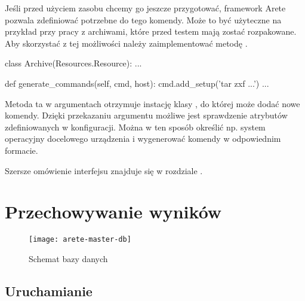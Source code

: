 \documentclass[00-praca-magisterska.tex]{subfiles}
\begin{document}
Jeśli przed użyciem zasobu chcemy go jeszcze przygotować, framework Arete
pozwala zdefiniować potrzebne do tego komendy. Może to być użyteczne na
przykład przy pracy z archiwami, które przed testem mają zostać rozpakowane. Aby
skorzystać z tej możliwości należy zaimplementować metodę
.

\begin{pythoncode}
  class Archive(Resources.Resource):
      ...

      def generate_commands(self, cmd, host):
          cmd.add_setup('tar zxf ...')
	  ...
\end{pythoncode}

Metoda ta w argumentach otrzymuje instację klasy , do której
może dodać nowe komendy. Dzięki przekazaniu argumentu  możliwe jest
sprawdzenie atrybutów zdefiniowanych w konfiguracji. Można w ten sposób
określić np. system operacyjny docelowego urządzenia i wygenerować komendy w
odpowiednim formacie.

Szersze omówienie interfejsu  znajduje się w rozdziale
.

\section{Przechowywanie wyników}

\begin{figure}[htb]
\begin{center}
\leavevmode
\texttt{[image: arete-master-db]}
\end{center}
\caption{Schemat bazy danych}
\label{fig:arete-master-db}
\end{figure}


\subsection{Uruchamianie}

\end{document}
